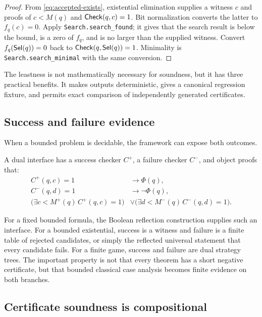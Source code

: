 \begin{proof}
From \eqref{eq:accepted-exists}, existential elimination supplies a witness \(c\) and proofs of \(c<M(q)\) and \(\mathsf{Check}(q,c)=1\).  Bit normalization converts the latter to \(f_q(c)=0\).  Apply \texttt{Search.search\_found}; it gives that the search result is below the bound, is a zero of \(f_q\), and is no larger than the supplied witness.  Convert \(f_q(\mathsf{Sel}(q))=0\) back to \(\mathsf{Check}(q,\mathsf{Sel}(q))=1\).  Minimality is \texttt{Search.search\_minimal} with the same conversion.
\end{proof}

The leastness is not mathematically necessary for soundness, but it has three practical benefits.  It makes outputs deterministic, gives a canonical regression fixture, and permits exact comparison of independently generated certificates.

\subsection{Success and failure evidence}

When a bounded problem is decidable, the framework can expose both outcomes.

\begin{definition}
A dual interface has a success checker \(C^+\), a failure checker \(C^-\), and object proofs that:
\begin{align*}
 C^+(q,c)=1 &\to \Phi(q),\\
 C^-(q,d)=1 &\to \neg\Phi(q),\\
 \bigl(\exists c<M^+(q)\,C^+(q,c)=1\bigr)
 &\vee
 \bigl(\exists d<M^-(q)\,C^-(q,d)=1\bigr).
\end{align*}
\end{definition}

For a fixed bounded formula, the Boolean reflection construction supplies such an interface.  For a bounded existential, success is a witness and failure is a finite table of rejected candidates, or simply the reflected universal statement that every candidate fails.  For a finite game, success and failure are dual strategy trees.  The important property is not that every theorem has a short negative certificate, but that bounded classical case analysis becomes finite evidence on both branches.

\subsection{Certificate soundness is compositional}

